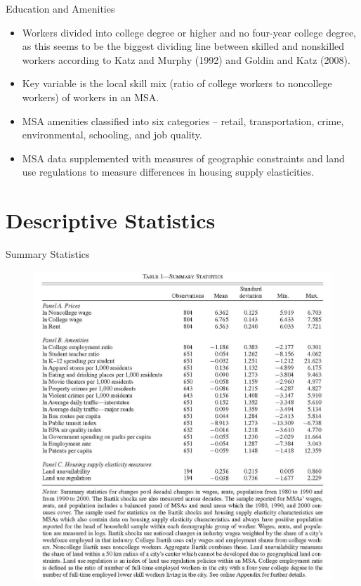 \documentclass[aspectratio=169]{beamer}
\begin{document}
\begin{frame}{Education and Amenities}

\begin{itemize}
    \item<1-> Workers divided into college degree or higher and no four-year college degree, as this seems to be the biggest dividing line between skilled and nonskilled workers according to Katz and Murphy (1992) and Goldin and Katz (2008).
    \item<2-> Key variable is the local skill mix (ratio of college workers to noncollege workers) of workers in an MSA.
    \item<3-> MSA amenities classified into six categories – retail, transportation, crime, environmental, schooling, and job quality.
    \item<4-> MSA data supplemented with measures of geographic constraints and land use regulations to measure differences in housing supply elasticities.
\end{itemize}
    
\end{frame}


\section{Descriptive Statistics}


\begin{frame}{Summary Statistics}

\begin{figure}
    \centering
    \includegraphics[scale=0.5]{DiamondTable1.jpg}
    \label{fig:Table1}
\end{figure}
    
\end{frame}
\end{document}
